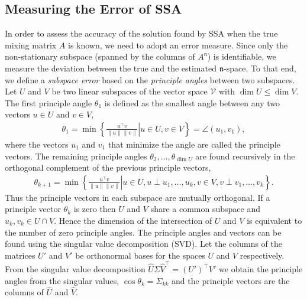\documentclass{article}
\newcommand{\1}{\ensuremath{\mathds{1}}}
\newcommand{\n}{\ensuremath{\mathfrak{n}}}
\newcommand{\0}{\ensuremath{0}}
\begin{document}
\begin{appendices}

\section{Measuring the Error of SSA}

In order to assess the accuracy of the solution found by SSA when the true mixing matrix $A$ 
is known, we need to adopt an error measure. Since only the non-stationary subspace (spanned 
by the columns of $A^\n$) is identifiable, we measure the deviation between the true and the
estimated \n-space. To that end, we define a \textit{subspace error} based on the 
\textit{principle angles} between two subspaces. Let $U$ and $V$ be two linear subspaces of the 
vector space $\mathcal{V}$ with $\dim U \leq \dim V$. The first principle angle $\theta_1$ is 
defined as the smallest angle between any two vectors $u \in U$ and $v \in V$, 
\begin{align*}
	\theta_1 = \min \left. \left\{ \frac{ u^\top v }{ \| u \| \| v \| } \right| u \in U, v \in V \right\} = \angle(u_1, v_1),
\end{align*}
where the vectors $u_1$ and $v_1$ that minimize the angle are called the principle vectors.
The remaining principle angles $\theta_2, \ldots, \theta_{\dim U}$ are found recursively in the orthogonal 
complement of the previous principle vectors, 
\begin{align*}
	\theta_{k+1} = \min \left. \left\{ \frac{ u^\top v }{ \| u \| \| v \| } \right| u \in U, u \perp u_1, \ldots, u_k , 
			v \in V, v \perp v_1, \ldots, v_k \right\} . 
\end{align*}
Thus the principle vectors in each subspace are mutually orthogonal. If a principle vector $\theta_k$ is zero 
then $U$ and $V$ share a common subspace and $u_k,v_k \in U \cap V$. Hence the dimension of the intersection
of $U$ and $V$ is equivalent to the number of zero principle angles. The principle angles and vectors
can be found using the singular value decomposition (SVD). Let the columns of the matrices $U'$ and $V'$ be 
orthonormal bases for the spaces $U$ and $V$ respectively. From the singular value decomposition 
$\hat{U} \Sigma \hat{V}^\top = (U')^\top V'$ we obtain the principle angles from the singular values, 
$\cos \theta_k = \Sigma_{kk}$ and the principle vectors are the columns of $\hat{U}$ and $\hat{V}$. 


\end{appendices}
\end{document}
